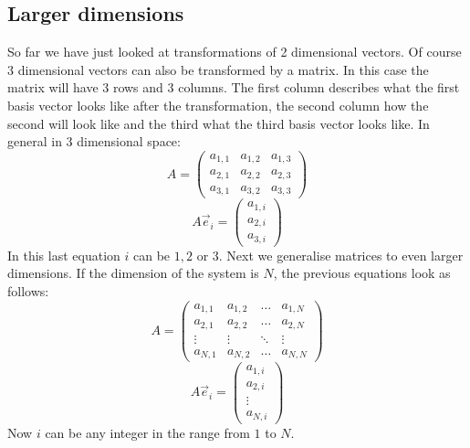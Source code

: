 \documentclass[a4paper]{report}
\begin{document}
\subsection{Larger dimensions}
So far we have just looked at transformations of 2 dimensional vectors. Of course 3 dimensional vectors can also be transformed by a matrix. In this case the matrix will have 3 rows and 3 columns. The first column describes what the first basis vector looks like after the transformation, the second column how the second will look like and the third what the third basis vector looks like. In general in 3 dimensional space:
\begin{equation}
A = \begin{pmatrix} a_{1,1} & a_{1,2} & a_{1,3} \\ a_{2,1} & a_{2,2} & a_{2,3} \\ a_{3,1} & a_{3,2} & a_{3,3} \end{pmatrix}
\end{equation}
\begin{equation}
A\vec{e}_i = \begin{pmatrix} a_{1,i} \\ a_{2,i} \\ a_{3,i} \end{pmatrix}
\end{equation}
In this last equation $i$ can be $1,2$ or $3$. Next we generalise matrices to even larger dimensions. If the dimension of the system is $N$, the previous equations look as follows:
\begin{equation}
A = \begin{pmatrix} a_{1,1} & a_{1,2} & \dots & a_{1,N} \\ a_{2,1} & a_{2,2} & \dots & a_{2,N} \\
\vdots & \vdots & \ddots & \vdots\\ a_{N,1} & a_{N,2} & \dots & a_{N,N} \end{pmatrix}
\end{equation}
\begin{equation}
A\vec{e}_i = \begin{pmatrix} a_{1,i} \\ a_{2,i} \\ \vdots \\ a_{N,i} \end{pmatrix}
\end{equation}
Now $i$ can be any integer in the range from $1$ to $N$.
\end{document}
